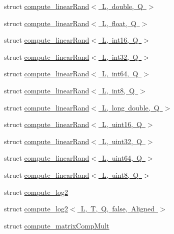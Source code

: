 \begin{DoxyCompactItemize}
\item 
struct \mbox{\hyperlink{structglm_1_1detail_1_1compute__linear_rand_3_01_l_00_01double_00_01_q_01_4}{compute\+\_\+linear\+Rand$<$ L, double, Q $>$}}
\item 
struct \mbox{\hyperlink{structglm_1_1detail_1_1compute__linear_rand_3_01_l_00_01float_00_01_q_01_4}{compute\+\_\+linear\+Rand$<$ L, float, Q $>$}}
\item 
struct \mbox{\hyperlink{structglm_1_1detail_1_1compute__linear_rand_3_01_l_00_01int16_00_01_q_01_4}{compute\+\_\+linear\+Rand$<$ L, int16, Q $>$}}
\item 
struct \mbox{\hyperlink{structglm_1_1detail_1_1compute__linear_rand_3_01_l_00_01int32_00_01_q_01_4}{compute\+\_\+linear\+Rand$<$ L, int32, Q $>$}}
\item 
struct \mbox{\hyperlink{structglm_1_1detail_1_1compute__linear_rand_3_01_l_00_01int64_00_01_q_01_4}{compute\+\_\+linear\+Rand$<$ L, int64, Q $>$}}
\item 
struct \mbox{\hyperlink{structglm_1_1detail_1_1compute__linear_rand_3_01_l_00_01int8_00_01_q_01_4}{compute\+\_\+linear\+Rand$<$ L, int8, Q $>$}}
\item 
struct \mbox{\hyperlink{structglm_1_1detail_1_1compute__linear_rand_3_01_l_00_01long_01double_00_01_q_01_4}{compute\+\_\+linear\+Rand$<$ L, long double, Q $>$}}
\item 
struct \mbox{\hyperlink{structglm_1_1detail_1_1compute__linear_rand_3_01_l_00_01uint16_00_01_q_01_4}{compute\+\_\+linear\+Rand$<$ L, uint16, Q $>$}}
\item 
struct \mbox{\hyperlink{structglm_1_1detail_1_1compute__linear_rand_3_01_l_00_01uint32_00_01_q_01_4}{compute\+\_\+linear\+Rand$<$ L, uint32, Q $>$}}
\item 
struct \mbox{\hyperlink{structglm_1_1detail_1_1compute__linear_rand_3_01_l_00_01uint64_00_01_q_01_4}{compute\+\_\+linear\+Rand$<$ L, uint64, Q $>$}}
\item 
struct \mbox{\hyperlink{structglm_1_1detail_1_1compute__linear_rand_3_01_l_00_01uint8_00_01_q_01_4}{compute\+\_\+linear\+Rand$<$ L, uint8, Q $>$}}
\item 
struct \mbox{\hyperlink{structglm_1_1detail_1_1compute__log2}{compute\+\_\+log2}}
\item 
struct \mbox{\hyperlink{structglm_1_1detail_1_1compute__log2_3_01_l_00_01_t_00_01_q_00_01false_00_01_aligned_01_4}{compute\+\_\+log2$<$ L, T, Q, false, Aligned $>$}}
\item 
struct \mbox{\hyperlink{structglm_1_1detail_1_1compute__matrix_comp_mult}{compute\+\_\+matrix\+Comp\+Mult}}

\end{DoxyCompactItemize}
